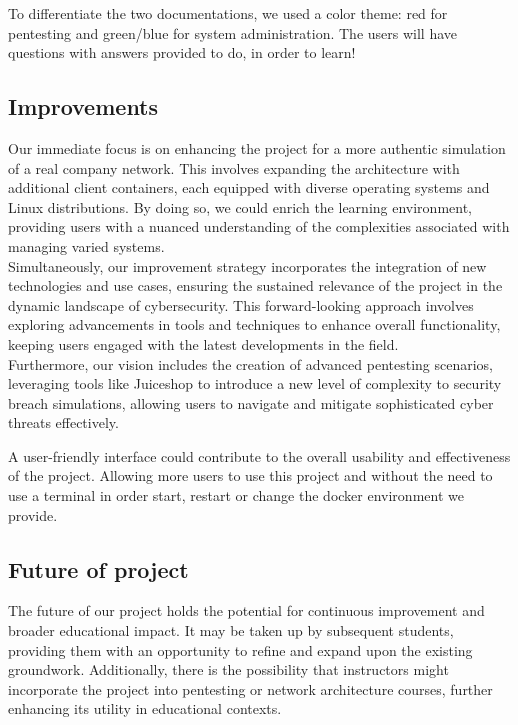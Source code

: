 \documentclass[a4paper,11pt,singlespacing]{article}
\begin{document}
To differentiate the two documentations, we used a color theme: red for pentesting and green/blue for system administration. The users will have questions with answers provided to do, in order to learn!

\subsection{Improvements}

Our immediate focus is on enhancing the project for a more authentic simulation of a real company network. This involves expanding the architecture with additional client containers, each equipped with diverse operating systems and Linux distributions. By doing so, we could enrich the learning environment, providing users with a nuanced understanding of the complexities associated with managing varied systems.\\

Simultaneously, our improvement strategy incorporates the integration of new technologies and use cases, ensuring the sustained relevance of the project in the dynamic landscape of cybersecurity. This forward-looking approach involves exploring advancements in tools and techniques to enhance overall functionality, keeping users engaged with the latest developments in the field. \\ 

Furthermore, our vision includes the creation of advanced pentesting scenarios, leveraging tools like Juiceshop to introduce a new level of complexity to security breach simulations, allowing users to navigate and mitigate sophisticated cyber threats effectively.

A user-friendly interface could contribute to the overall usability and effectiveness of the project. Allowing more users to use this project and without the need to use a terminal in order start, restart or change the docker environment we provide.\\

\subsection{Future of project}

The future of our project holds the potential for continuous improvement and broader educational impact. It may be taken up by subsequent students, providing them with an opportunity to refine and expand upon the existing groundwork. Additionally, there is the possibility that instructors might incorporate the project into pentesting or network architecture courses, further enhancing its utility in educational contexts.\\
\end{document}
